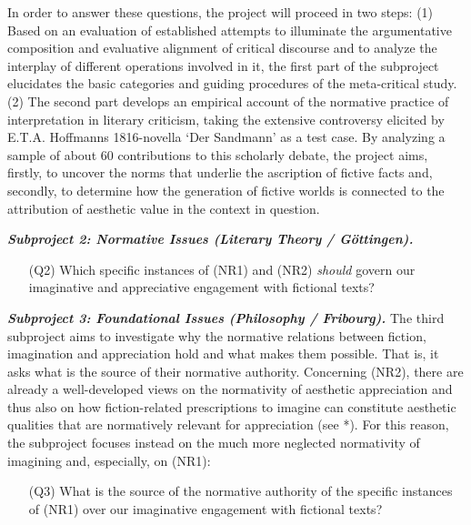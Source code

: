 In order to answer these questions, the project will proceed in two steps: (1) Based on an evaluation of established attempts to illuminate the argumentative composition and evaluative alignment of critical discourse and to analyze the interplay of different operations involved in it, the first part of the subproject elucidates the basic categories and guiding procedures of the meta-critical study. (2) The second part develops an empirical account of the normative practice of interpretation in literary criticism, taking the extensive controversy elicited by E.T.A. Hoffmanns 1816-novella `Der Sandmann' as a test case. By analyzing a sample of about 60 contributions to this scholarly debate, the project aims, firstly, to uncover the norms that underlie the ascription of fictive facts and, secondly, to determine how the generation of fictive worlds is connected to the attribution of aesthetic value in the context in question.



\vspace{.2cm}
\noindent\textbf{\emph{Subproject 2: Normative Issues (Literary Theory / G\"ottingen).}}

\vspace{-.1cm}
\begin{itemize}[leftmargin=2cm]
\item[(Q2)] Which specific instances of (NR1) and (NR2) \emph{should} govern our imaginative and appreciative engagement with fictional texts?
\end{itemize}
\vspace{-.1cm}


\vspace{.2cm}
\noindent\textbf{\emph{Subproject 3: Foundational Issues (Philosophy / Fribourg).}} The third subproject aims to investigate why the normative relations between fiction, imagination and appreciation hold and what makes them possible. That is, it asks what is the source of their normative authority. Concerning (NR2), there are already a well-developed views on the normativity of aesthetic appreciation and thus also on how fiction-related prescriptions to imagine can constitute aesthetic qualities that are normatively relevant for appreciation (see *). For this reason, the subproject focuses instead on the much more neglected normativity of imagining and, especially, on (NR1): 

\vspace{-.1cm}
\begin{itemize}[leftmargin=2cm]
\item[(Q3)] What is the source of the normative authority of the specific instances of (NR1) over our imaginative engagement with fictional texts?
\end{itemize}
\vspace{-.1cm}


